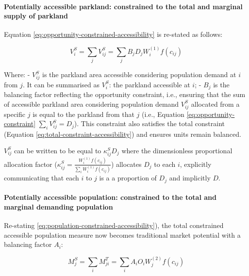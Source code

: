 \documentclass[
11pt, %
oneside, %
english, %
singlespacing, %
]{macthesis} %
\begin{document}
\paragraph{Potentially accessible parkland: constrained to the total and marginal supply of parkland}\label{potentially-accessible-parkland-constrained-to-the-total-and-marginal-supply-of-parkland}

Equation \ref{eq:opportunity-constrained-accessibility} is re-stated as follows:

\begin{equation}
\label{eq:opportunity-constrained-accessibility}
V^S_{i} = \sum_j V^S_{ij} = \sum_j B_j D_j W_i^{(1)} f(c_{ij})
\end{equation} 

Where:
- \(V^S_{ij}\) is the parkland area accessible considering population demand at \(i\) from \(j\). It can be summarised as \(V^S_{i}\): the parkland accessible at \(i\);
- \(B_j\) is the balancing factor reflecting the opportunity constraint, i.e., ensuring that the sum of accessible parkland area considering population demand \(V^S_{ij}\) allocated from a specific \(j\) is equal to the parkland from that \(j\) (i.e., Equation \ref{eq:opportunity-constraint} \(\sum_i V^S_{ij} =  D_j\)). This constraint also satisfies the total constraint (Equation \ref{eq:total-constraint-accessibility}) and ensures units remain balanced.

\(V_{ij}^S\) can be written to be equal to \(\kappa_{ij}^S D_j\) where the dimensionless proportional allocation factor (\(\kappa_{ij}^S = \frac{W_i^{(1)} f(c_{ij})}{\sum_i W_i^{(1)} f(c_{ij})}\)) allocates \(D_j\) to each \(i\), explicitly communicating that each \(i\) to \(j\) is a a proportion of \(D_j\) and implicitly \(D\).

\paragraph{Potentially accessible population: constrained to the total and marginal demanding population}\label{potentially-accessible-population-constrained-to-the-total-and-marginal-demanding-population}

Re-stating \ref{eq:population-constrained-accessibility}), the total constrained accessible population measure now becomes traditional market potential with a balancing factor \(A_i\):

\begin{equation}
\label{eq:population-constrained-accessibility}
M^S_j = \sum_i M^T_{ji} = \sum_i A_i O_i W_j^{(2)} f(c_{ij})
\end{equation} 
\end{document}

